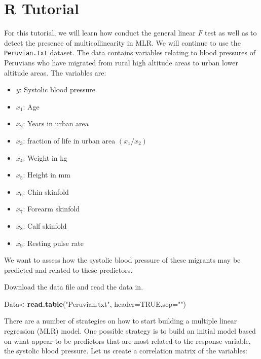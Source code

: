 \documentclass[
]{book}
\newenvironment{Shaded}{\begin{snugshade}}{\end{snugshade}}
\newcommand{\AttributeTok}[1]{\textcolor[rgb]{0.13,0.29,0.53}{#1}}
\newcommand{\ConstantTok}[1]{\textcolor[rgb]{0.56,0.35,0.01}{#1}}
\newcommand{\FunctionTok}[1]{\textcolor[rgb]{0.13,0.29,0.53}{\textbf{#1}}}
\newcommand{\NormalTok}[1]{#1}
\newcommand{\OtherTok}[1]{\textcolor[rgb]{0.56,0.35,0.01}{#1}}
\newcommand{\StringTok}[1]{\textcolor[rgb]{0.31,0.60,0.02}{#1}}
\providecommand{\tightlist}{%
  \setlength{\itemsep}{0pt}\setlength{\parskip}{0pt}}
\begin{document}
\hypertarget{r-tutorial-4}{%
\section{R Tutorial}\label{r-tutorial-4}}

For this tutorial, we will learn how conduct the general linear \(F\) test as well as to detect the presence of multicollinearity in MLR. We will continue to use the \texttt{Peruvian.txt} dataset. The data contains variables relating to blood pressures of Peruvians who have migrated from rural high altitude areas to urban lower altitude areas. The variables are:

\begin{itemize}
\tightlist
\item
  \(y\): Systolic blood pressure
\item
  \(x_1\): Age
\item
  \(x_2\): Years in urban area
\item
  \(x_3\): fraction of life in urban area \((x_1/x_2)\)
\item
  \(x_4\): Weight in kg
\item
  \(x_5\): Height in mm
\item
  \(x_6\): Chin skinfold
\item
  \(x_7\): Forearm skinfold
\item
  \(x_8\): Calf skinfold
\item
  \(x_9\): Resting pulse rate
\end{itemize}

We want to assess how the systolic blood pressure of these migrants may be predicted and related to these predictors.

Download the data file and read the data in.

\begin{Shaded}
\begin{Highlighting}[]
\NormalTok{Data}\OtherTok{\textless{}{-}}\FunctionTok{read.table}\NormalTok{(}\StringTok{"Peruvian.txt"}\NormalTok{, }\AttributeTok{header=}\ConstantTok{TRUE}\NormalTok{,}\AttributeTok{sep=}\StringTok{""}\NormalTok{)}
\end{Highlighting}
\end{Shaded}

There are a number of strategies on how to start building a multiple linear regression (MLR) model. One possible strategy is to build an initial model based on what appear to be predictors that are most related to the response variable, the systolic blood pressure. Let us create a correlation matrix of the variables:
\end{document}
